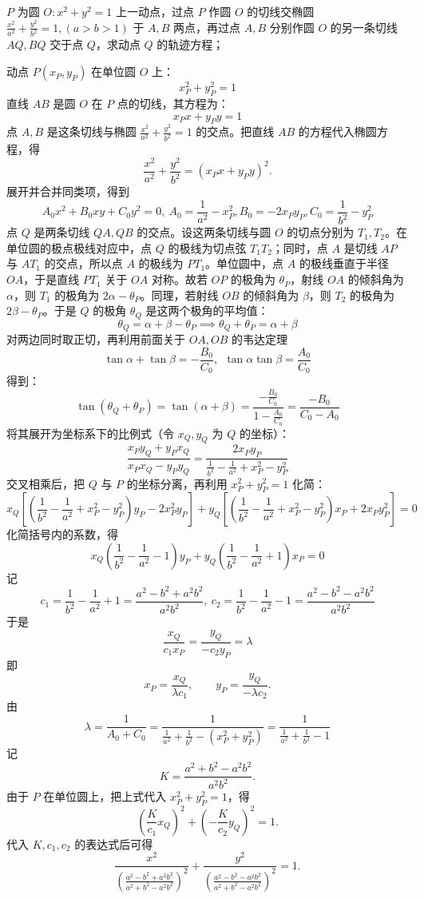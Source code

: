 \begin{exercise}
     $P$ 为圆 $O: x^2 + y^2 = 1$ 上一动点，过点 $P$ 作圆 $O$ 的切线交椭圆 $\frac{x^2}{a^2} + \frac{y^2}{b^2} = 1, (a > b > 1)$ 于 $A, B$ 两点，再过点 $A, B$ 分别作圆 $O$ 的另一条切线 $AQ, BQ$ 交于点 $Q$，求动点 $Q$ 的轨迹方程；
\end{exercise}
\begin{solution}
动点 $P(x_P, y_P)$ 在单位圆 $O$ 上：$$x_P^2 + y_P^2 = 1$$
直线 $AB$ 是圆 $O$ 在 $P$ 点的切线，其方程为：$$x_P x + y_P y = 1$$
点 $A, B$ 是这条切线与椭圆 $\frac{x^2}{a^2} + \frac{y^2}{b^2} = 1$ 的交点。把直线 $AB$ 的方程代入椭圆方程，得
$$\frac{x^2}{a^2} + \frac{y^2}{b^2} = (x_P x + y_P y)^2.$$
展开并合并同类项，得到
\[A_0 x^2 + B_0 xy + C_0 y^2 = 0,~A_0 = \frac{1}{a^2} - x_P^2,B_0 = -2x_P y_P,C_0 = \frac{1}{b^2} - y_P^2\]
点 $Q$ 是两条切线 $QA, QB$ 的交点。设这两条切线与圆 $O$ 的切点分别为 $T_1, T_2$。在单位圆的极点极线对应中，点 $Q$ 的极线为切点弦 $T_1T_2$；同时，点 $A$ 是切线 $AP$ 与 $AT_1$ 的交点，所以点 $A$ 的极线为 $PT_1$。单位圆中，点 $A$ 的极线垂直于半径 $OA$，于是直线 $PT_1$ 关于 $OA$ 对称。故若 $OP$ 的极角为 $\theta_P$，射线 $OA$ 的倾斜角为 $\alpha$，则 $T_1$ 的极角为 $2\alpha-\theta_P$。同理，若射线 $OB$ 的倾斜角为 $\beta$，则 $T_2$ 的极角为 $2\beta-\theta_P$。于是 $Q$ 的极角 $\theta_Q$ 是这两个极角的平均值：
$$\theta_Q = \alpha + \beta - \theta_P \implies \theta_Q + \theta_P = \alpha + \beta$$
对两边同时取正切，再利用前面关于 $OA, OB$ 的韦达定理
\[\tan\alpha + \tan\beta = -\frac{B_0}{C_0},~~\tan\alpha \tan\beta = \frac{A_0}{C_0}\]
得到：$$\tan(\theta_Q + \theta_P) = \tan(\alpha + \beta) = \frac{-\frac{B_0}{C_0}}{1 - \frac{A_0}{C_0}} = \frac{-B_0}{C_0 - A_0}$$
将其展开为坐标系下的比例式（令 $x_Q, y_Q$ 为 $Q$ 的坐标）：$$\frac{x_P y_Q + y_P x_Q}{x_P x_Q - y_P y_Q} = \frac{2x_P y_P}{\frac{1}{b^2} - \frac{1}{a^2} + x_P^2 - y_P^2}$$
交叉相乘后，把 $Q$ 与 $P$ 的坐标分离，再利用 $x_P^2 + y_P^2 = 1$ 化简：
$$x_Q \left[ \left(\frac{1}{b^2} - \frac{1}{a^2} + x_P^2 - y_P^2\right) y_P - 2x_P^2 y_P \right] + y_Q \left[ \left(\frac{1}{b^2} - \frac{1}{a^2} + x_P^2 - y_P^2\right) x_P + 2x_P y_P^2 \right] = 0$$
化简括号内的系数，得
$$x_Q \left( \frac{1}{b^2} - \frac{1}{a^2} - 1 \right) y_P + y_Q \left( \frac{1}{b^2} - \frac{1}{a^2} + 1 \right) x_P = 0$$
记
\[c_1 = \frac{1}{b^2} - \frac{1}{a^2} + 1 = \frac{a^2 - b^2 + a^2 b^2}{a^2 b^2},~c_2 = \frac{1}{b^2} - \frac{1}{a^2} - 1 = \frac{a^2 - b^2 - a^2 b^2}{a^2 b^2}\]
于是
$$\frac{x_Q}{c_1 x_P} = \frac{y_Q}{-c_2 y_P} = \lambda$$
即
$$x_P = \frac{x_Q}{\lambda c_1}, \qquad y_P = \frac{y_Q}{-\lambda c_2}.$$
由
$$\lambda = \frac{1}{A_0 + C_0} = \frac{1}{\frac{1}{a^2} + \frac{1}{b^2} - (x_P^2 + y_P^2)} = \frac{1}{\frac{1}{a^2} + \frac{1}{b^2} - 1}$$
记
$$K = \frac{a^2 + b^2 - a^2 b^2}{a^2 b^2}.$$
由于 $P$ 在单位圆上，把上式代入 $x_P^2 + y_P^2 = 1$，得
$$\left( \frac{K}{c_1} x_Q \right)^2 + \left( -\frac{K}{c_2} y_Q \right)^2 = 1.$$
代入 $K,c_1,c_2$ 的表达式后可得
$$\frac{x^2}{\left( \frac{a^2 - b^2 + a^2 b^2}{a^2 + b^2 - a^2 b^2} \right)^2} + \frac{y^2}{\left( \frac{a^2 - b^2 - a^2 b^2}{a^2 + b^2 - a^2 b^2} \right)^2} = 1.$$
\end{solution}

